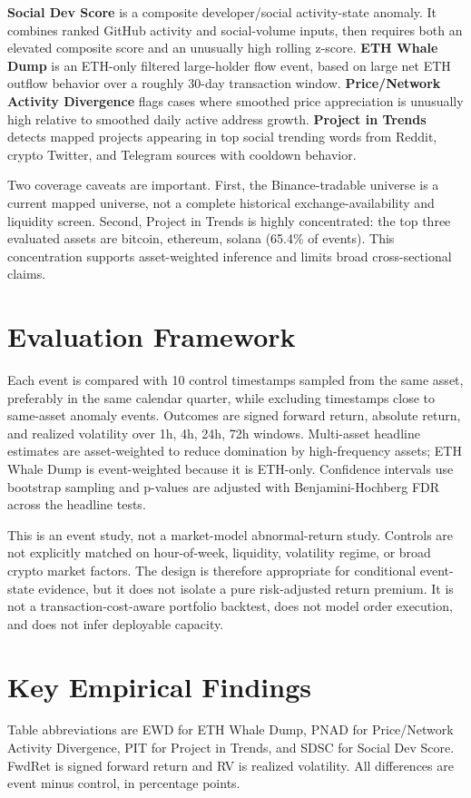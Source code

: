 \documentclass[11pt]{article}
\begin{document}
\textbf{Social Dev Score} is a composite developer/social activity-state anomaly. It combines ranked GitHub activity and social-volume inputs, then requires both an elevated composite score and an unusually high rolling z-score. \textbf{ETH Whale Dump} is an ETH-only filtered large-holder flow event, based on large net ETH outflow behavior over a roughly 30-day transaction window. \textbf{Price/Network Activity Divergence} flags cases where smoothed price appreciation is unusually high relative to smoothed daily active address growth. \textbf{Project in Trends} detects mapped projects appearing in top social trending words from Reddit, crypto Twitter, and Telegram sources with cooldown behavior.

Two coverage caveats are important. First, the Binance-tradable universe is a current mapped universe, not a complete historical exchange-availability and liquidity screen. Second, Project in Trends is highly concentrated: the top three evaluated assets are bitcoin, ethereum, solana (65.4\% of events). This concentration supports asset-weighted inference and limits broad cross-sectional claims.

\section{Evaluation Framework}
Each event is compared with 10 control timestamps sampled from the same asset, preferably in the same calendar quarter, while excluding timestamps close to same-asset anomaly events. Outcomes are signed forward return, absolute return, and realized volatility over 1h, 4h, 24h, 72h windows. Multi-asset headline estimates are asset-weighted to reduce domination by high-frequency assets; ETH Whale Dump is event-weighted because it is ETH-only. Confidence intervals use bootstrap sampling and p-values are adjusted with Benjamini-Hochberg FDR across the headline tests.

This is an event study, not a market-model abnormal-return study. Controls are not explicitly matched on hour-of-week, liquidity, volatility regime, or broad crypto market factors. The design is therefore appropriate for conditional event-state evidence, but it does not isolate a pure risk-adjusted return premium. It is not a transaction-cost-aware portfolio backtest, does not model order execution, and does not infer deployable capacity.

\section{Key Empirical Findings}
Table abbreviations are EWD for ETH Whale Dump, PNAD for Price/Network Activity Divergence, PIT for Project in Trends, and SDSC for Social Dev Score. FwdRet is signed forward return and RV is realized volatility. All differences are event minus control, in percentage points.
\end{document}
